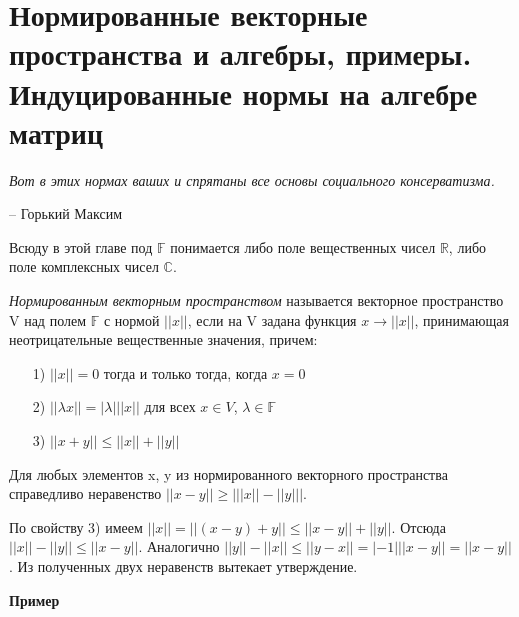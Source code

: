 \chapter{Нормированные векторные пространства и алгебры, примеры. Индуцированные нормы на алгебре матриц}
\label{cha:26}

\epigraph{
	\textit{Вот в этих нормах ваших и спрятаны все основы социального консерватизма.}}
{-- Горький Максим}

Всюду в этой главе под $\mathbb{F}$ понимается либо поле вещественных чисел $\mathbb{R}$, либо поле комплексных чисел $\mathbb{C}$.

\begin{definition}\label{cha:26/def:1}
	\textit{Нормированным векторным пространством} называется векторное пространство V над полем $\mathbb{F}$ с нормой $||x||$, если на V задана функция $x \to ||x||$, принимающая неотрицательные вещественные значения, причем:
	\begin{itemize}
		\item[1)] $||x|| = 0$ тогда и только тогда, когда $x = 0$
		\item[2)] $||\lambda x|| = |\lambda| ||x||$ для всех $x \in V$, $\lambda \in \mathbb{F}$
		\item[3)] $||x + y|| \le ||x|| + ||y||$
	\end{itemize}
\end{definition}

\begin{propose}\label{cha:26/propose:1}
	Для любых элементов x, y из нормированного векторного пространства справедливо неравенство $||x − y|| \ge \Big| ||x|| - ||y|| \Big|$.
\end{propose}
\begin{Proof}
	По свойству 3) имеем $||x|| = ||(x−y)+y|| \le ||x−y||+||y||$. Отсюда $||x||−||y|| \le ||x−y||$. Аналогично $||y||−||x|| \le ||y − x|| = | − 1|||x − y|| = ||x − y||$. Из полученных двух неравенств вытекает утверждение.
\end{Proof}

\textbf{Пример}

